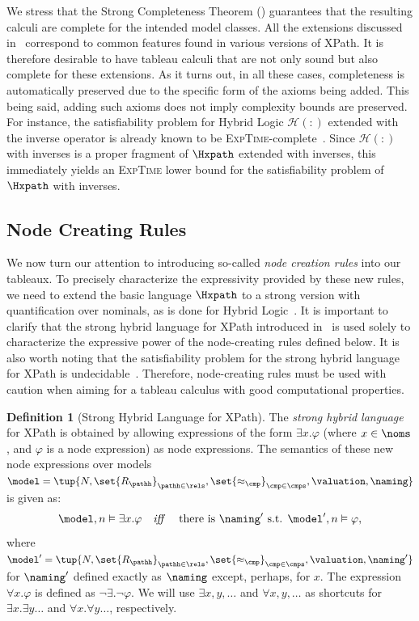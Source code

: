 \documentclass[10pt,a4paper]{amsart}
\theoremstyle{definition}
\newtheorem{defi}[thm]{Definition}
\theoremstyle{remark}
\begin{document}
We stress that the Strong Completeness Theorem () guarantees that the resulting calculi are complete for the intended model classes.  All the extensions discussed in~ correspond to common features found in various versions of XPath. It is therefore desirable to have tableau calculi that are not only sound but also complete for these extensions. As it turns out, in all these cases, completeness is automatically preserved due to the specific form of the axioms being added. This being said, adding such axioms does not imply complexity bounds are preserved.  
For instance, the satisfiability problem for Hybrid Logic $\mathcal{H}(:)$ extended with the inverse operator is already known to be \textsc{ExpTime}-complete~\cite{Areces2000c}. Since $\mathcal{H}(:)$ with inverses is a proper fragment of $\Hxpath$ extended with inverses, this immediately yields an \textsc{ExpTime} lower bound for the satisfiability problem of $\Hxpath$ with inverses.

\subsection{Node Creating Rules} We now turn our attention to introducing so-called \emph{node creation rules} into our tableaux. To precisely characterize the expressivity provided by these new rules, we need to extend the basic language $\Hxpath$ to a strong version with quantification over nominals, as is done for Hybrid Logic~\cite{BlackburnS95}. It is important to clarify that the strong hybrid language for XPath introduced in~ is used solely to characterize the expressive power of the node-creating rules defined below. It is also worth noting that the satisfiability problem for the strong hybrid language for XPath is undecidable~\cite{arec:hybr05b}. Therefore, node-creating rules must be used with caution when aiming for a tableau calculus with good computational properties. 

\begin{defi}[Strong Hybrid Language for XPath]\label{def:strong}
    \label{def:stronghl}
    The \emph{strong hybrid language} for XPath is obtained by allowing expressions of the form $\exists x.\varphi$ (where $x\in\noms$, and $\varphi$ is a node expression) as node expressions.
    The semantics of these new node expressions over models $\model = \tup{N, \set{R_\pathh}_{\pathh \in \rels}, \set{\approx_{\cmp}}_{\cmp\in\cmps}, \valuation, \naming}$ is given as:
    \[
        \begin{array}{lcl}
            \model,n\vDash\exists x.\varphi & \text{\it iff } & \text{there is $ \naming'$ s.t. } \model',n\vDash \varphi,
        \end{array}
    \]
    where $\model'= \tup{N, \set{R_\pathh}_{\pathh \in \rels}, \set{\approx_{\cmp}}_{\cmp\in\cmps}, \valuation, \naming'}$ for  $\naming'$ defined exactly as $\naming$ except, perhaps, for $x$. The expression $\forall x.\varphi$ is defined as $\neg\exists.\neg\varphi$.  We will use $\exists x,y,\ldots$ and $\forall x,y,\ldots$ as shortcuts for $\exists x.\exists y\ldots$ and $\forall x.\forall y\ldots$, respectively.
\end{defi}
\end{document}
